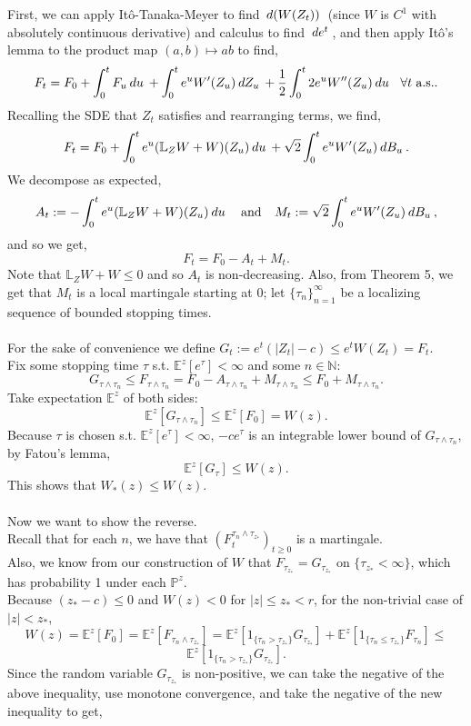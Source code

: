 \documentclass[12pt]{article}
\newcommand{\E}{\mathbb{E}}
\newcommand{\N}{\mathbb{N}}
\newcommand{\bL}{\mathbb{L}}
\newcommand{\Prb}{\mathbb{P}}
\newcommand{\df}[1]{\hspace{2 px} d #1 \hspace{2 px}}
\newcommand{\spc}{\hspace{7 px}}
\newcommand{\sspc}{\hspace{3 px}}
\newcommand{\ind}[1]{1_{\{#1\}}}
\newcommand{\als}{\text{a.s.}}
\theoremstyle{definition}
\begin{document}
First, we can apply Itô-Tanaka-Meyer to find $\df{(W(Z_t))}$ (since $W$ is $C^1$ with absolutely continuous derivative) and calculus to find $\df{e^t}$, and then apply Itô's lemma to the product map $(a, b) \mapsto ab$ to find,
\[
    F_t = F_0 + \int_0^t F_u \df{u} + \int_0^t e^u W'(Z_u) \df{Z_u} + \frac{1}{2} \int_0^t 2 e^u W''(Z_u) \df{u} \spc \forall t \sspc \als.
\]
Recalling the SDE that $Z_t$ satisfies and rearranging terms, we find,
\[
    F_t = F_0 + \int_0^t e^u (\bL_Z W + W)(Z_u) \df{u} + \sqrt{2} \int_0^t e^u W'(Z_u) \df{B_u}.
\]
We decompose as expected,
\[
    A_t := - \int_0^t e^u (\bL_Z W + W)(Z_u) \df{u} \spc \text{ and } \spc M_t := \sqrt{2} \int_0^t e^u W'(Z_u) \df{B_u},
\]
and so we get,
\[
    F_t = F_0 - A_t + M_t.
\]
Note that $\bL_Z W + W \leq 0$ and so $A_t$ is non-decreasing.
Also, from Theorem 5, we get that $M_t$ is a local martingale starting at 0; let $\{\tau_n\}_{n=1}^\infty$ be a localizing sequence of bounded stopping times. \\
\\
For the sake of convenience we define $G_t := e^t (|Z_t| - c) \leq e^t W(Z_t) = F_t$. \\
Fix some stopping time $\tau$ s.t. $\E^z[e^\tau] < \infty$ and some $n \in \N$:
\[
    G_{\tau \wedge \tau_n} \leq F_{\tau \wedge \tau_n} = F_0 - A_{\tau \wedge \tau_n} + M_{\tau \wedge \tau_n} \leq F_0 + M_{\tau \wedge \tau_n}.
\]
Take expectation $\E^z$ of both sides:
\[
    \E^z[G_{\tau \wedge \tau_n}] \leq \E^z[F_0] = W(z).
\]
Because $\tau$ is chosen s.t. $\E^z[e^\tau] < \infty$, $-c e^\tau$ is an integrable lower bound of $G_{\tau \wedge \tau_n}$, by Fatou's lemma,
\[
    \E^z [G_\tau] \leq W(z).
\]
This shows that $W_*(z) \leq W(z)$. \\
\\
Now we want to show the reverse. \\
Recall that for each $n$, we have that $(F^{\tau_n \wedge \tau_{z_*}}_t)_{t \geq 0}$ is a martingale. \\
Also, we know from our construction of $W$ that $F_{\tau_{z_*}} = G_{\tau_{z_*}}$ on $\{\tau_{z_*} < \infty\}$, which has probability 1 under each $\Prb^z$. \\
Because $(z_* - c) \leq 0$ and $W(z) < 0$ for $|z| \leq z_* < r$, for the non-trivial case of $|z| < z_*$,
\[
    W(z) = \E^z[F_0] = \E^z [F_{\tau_n \wedge \tau_{z_*}}] = \E^z [ \ind{\tau_n > \tau_{z_*}} G_{\tau_{z_*}} ] + \E^z[\ind{\tau_n \leq \tau_{z_*}} F_{\tau_n}] \leq
\]
\[
    \E^z [ \ind{\tau_n > \tau_{z_*}} G_{\tau_{z_*}} ].
\]
Since the random variable $G_{\tau_{z_*}}$ is non-positive, we can take the negative of the above inequality, use monotone convergence, and take the negative of the new inequality to get,
\end{document}
